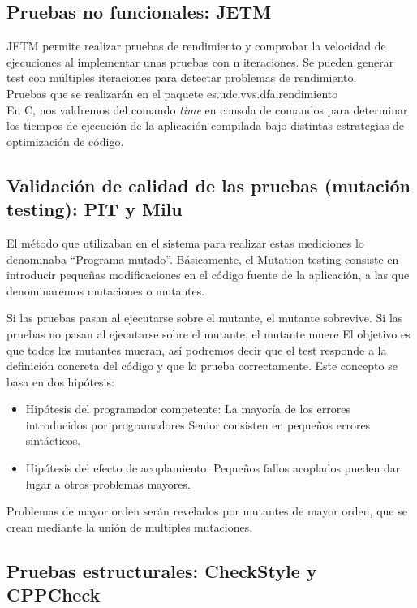 \documentclass[DIV=calc,paper=a4,fontsize=11pt,onecolumn]{scrartcl} %
\begin{document}
\subsection{Pruebas no funcionales: JETM}
JETM permite realizar pruebas de rendimiento y comprobar la velocidad de ejecuciones al implementar unas pruebas con n iteraciones. Se pueden generar test con múltiples iteraciones para detectar problemas de rendimiento. \\

Pruebas que se realizarán en el paquete es.udc.vvs.dfa.rendimiento \\

En C, nos valdremos del comando \textit{time} en consola de comandos para determinar los tiempos de ejecución de la aplicación compilada bajo distintas estrategias de optimización de código.

\subsection{Validación de calidad de las pruebas (mutación testing): PIT y Milu}

El  método que utilizaban en el sistema para realizar estas mediciones lo denominaba “Programa mutado”.
Básicamente, el Mutation testing consiste en introducir pequeñas modificaciones en el código fuente de la aplicación, a las que denominaremos mutaciones o mutantes.

Si las pruebas pasan al ejecutarse sobre el mutante, el mutante sobrevive.
Si las pruebas no pasan al ejecutarse sobre el mutante, el mutante muere
El objetivo es que todos los mutantes mueran, así podremos decir que el test responde a la definición concreta del código y que lo prueba correctamente.
Este concepto se basa en dos hipótesis:
\begin{itemize}
	\item Hipótesis del programador competente: La mayoría de los errores introducidos por programadores Senior consisten en pequeños errores sintácticos.
	\item Hipótesis del efecto de acoplamiento: Pequeños fallos acoplados pueden dar lugar a otros problemas mayores.
\end{itemize}
Problemas de mayor orden serán revelados por mutantes de mayor orden, que se crean mediante la unión de multiples mutaciones.

\subsection{Pruebas estructurales: CheckStyle y CPPCheck}
\end{document}
